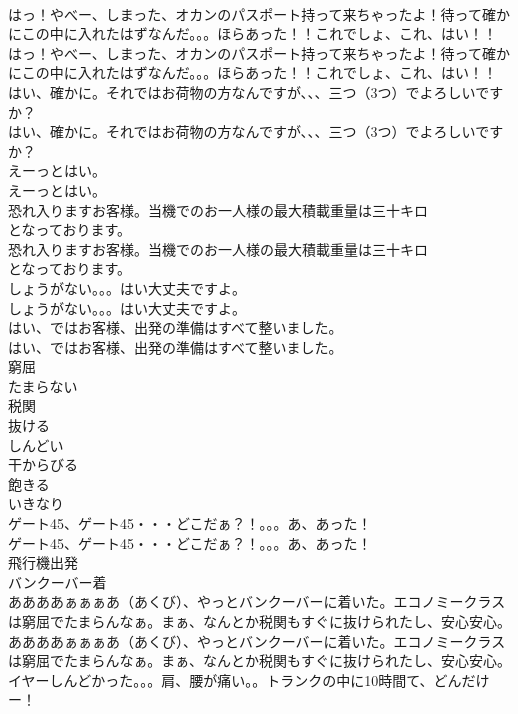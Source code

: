 \documentclass[8pt]{extreport}
\begin{document}
\begin{CJK}{UTF8}{min}
\\	はっ！やべー、しまった、オカンのパスポート持って来ちゃったよ！待って確かにこの中に入れたはずなんだ。。。ほらあった！！これでしょ、これ、はい！！	
\\	はっ！やべー、しまった、オカンのパスポート持って来ちゃったよ！待って確かにこの中に入れたはずなんだ。。。ほらあった！！これでしょ、これ、はい！！ 
\\	はい、確かに。それではお荷物の方なんですが、、、三つ（3つ）でよろしいですか？	
\\	はい、確かに。それではお荷物の方なんですが、、、三つ（3つ）でよろしいですか？ 
\\	えーっとはい。	
\\	えーっとはい。 
\\	恐れ入りますお客様。当機でのお一人様の最大積載重量は三十キロ
\\	となっております。	
\\	恐れ入りますお客様。当機でのお一人様の最大積載重量は三十キロ
\\	となっております。 
\\	しょうがない。。。はい大丈夫ですよ。	
\\	しょうがない。。。はい大丈夫ですよ。 
\\	はい、ではお客様、出発の準備はすべて整いました。	
\\	はい、ではお客様、出発の準備はすべて整いました。 
\\	窮屈
\\	たまらない
\\	税関
\\	抜ける
\\	しんどい
\\	干からびる
\\	飽きる
\\	いきなり
\\	ゲート45、ゲート45・・・どこだぁ？！。。。あ、あった！	
\\	ゲート45、ゲート45・・・どこだぁ？！。。。あ、あった！ 
\\	飛行機出発	
\\	バンクーバー着	
\\	ああああぁぁぁあ（あくび）、やっとバンクーバーに着いた。エコノミークラスは窮屈でたまらんなぁ。まぁ、なんとか税関もすぐに抜けられたし、安心安心。	
\\	ああああぁぁぁあ（あくび）、やっとバンクーバーに着いた。エコノミークラスは窮屈でたまらんなぁ。まぁ、なんとか税関もすぐに抜けられたし、安心安心。 
\\	イヤーしんどかった。。。肩、腰が痛い。。トランクの中に10時間て、どんだけー！	

\end{CJK}
\end{document}
